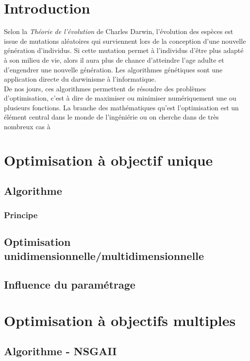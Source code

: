 \documentclass[12pt]{report}
\begin{document}
  \chapter{Introduction}
    Selon la \emph{Théorie de l'évolution} \cite{darwin} de Charles Darwin, l'évolution des espèces est issue de mutations aléatoires qui surviennent lors de la conception d'une nouvelle génération d'individus. Si cette mutation permet à l'individus d'être plus adapté à son milieu de vie, alors il aura plus de chance d'atteindre l'age adulte et d'engendrer une nouvelle génération.
    Les algorithmes génétiques sont une application directe du darwinisme à l'informatique.\\
    De nos jours, ces algorithmes permettent de résoudre des problèmes d'optimisation, c'est à dire de maximiser ou minimiser numériquement une ou plusieurs fonctions.
    La branche des mathématiques qu'est l'optimisation est un élément central dans le monde de l'ingéniérie ou on cherche dans de très nombreux cas à


  \tableofcontents

  \chapter{Optimisation à objectif unique}
    \section{Algorithme}
      \subsection{Principe}


    \section{Optimisation unidimensionnelle/multidimensionnelle}
    \section{Influence du paramétrage }



  \chapter{Optimisation à objectifs multiples}
    \section{Algorithme - NSGAII}
\end{document}
